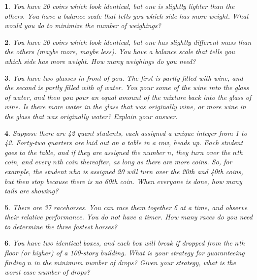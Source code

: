 \documentclass{report}
\newtheorem{problem}{}
\numberwithin{problem}{chapter} %
\begin{document}
\begin{problem}
You have 20 coins which look identical, but one is slightly lighter than the others. You have a balance scale that tells you which side has more weight. What would you do to minimize the number of weighings?
\end{problem}

\begin{problem}
You have 20 coins which look identical, but one has slightly different mass than the others (maybe more, maybe less). You have a balance scale that tells you which side has more weight. How many weighings do you need?
\end{problem}

\begin{problem}
You have two glasses in front of you. The first is partly filled with wine, and the second is partly filled with of water. You pour some of the wine into the glass of water, and then you pour an equal amount of the mixture back into the glass of wine. Is there more water in the glass that was originally wine, or more wine in the glass that was originally water? Explain your answer.
\end{problem}

\begin{problem}
Suppose there are 42 quant students, each assigned a unique integer from 1 to 42. Forty-two quarters are laid out on a table in a row, heads up. Each student goes to the table, and if they are assigned the number $n$, they turn over the $n$th coin, and every $n$th coin thereafter, as long as there are more coins. So, for example, the student who is assigned 20 will turn over the 20th and 40th coins, but then stop because there is no 60th coin. When everyone is done, how many tails are showing?
\end{problem}

\begin{problem}
There are 37 racehorses. You can race them together 6 at a time, and observe their relative performance. You do not have a timer. How many races do you need to determine the three fastest horses?
\end{problem}

\begin{problem}
You  have two identical boxes, and each box will break if dropped from the $n$th floor (or higher) of a 100-story building. What is your strategy for guaranteeing finding $n$ in the minimum number of drops? Given your strategy, what is the worst case number of drops?
\end{problem}
\end{document}

